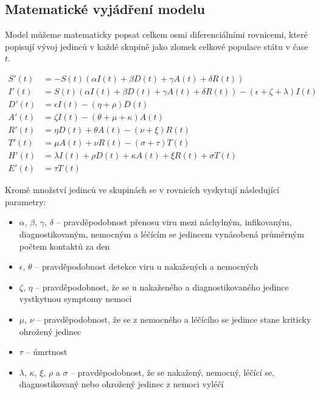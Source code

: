 \documentclass[a4paper,11pt]{article}
\begin{document}
		\subsection{Matematické vyjádření modelu}
		\label{mathmodel}
		Model můžeme matematicky popsat celkem osmi diferenciálními rovnicemi, které popisují vývoj jedinců v každé skupině jako zlomek celkové populace státu v čase $t$.
		
		\begin{align}
			S'(t) &= - S(t) (\alpha I(t) + \beta D(t) + \gamma A(t) + \delta R(t))\\
			I'(t) &= S(t) (\alpha I(t) + \beta D(t) + \gamma A(t) + \delta R(t)) - (\epsilon + \zeta + \lambda)I(t)\\
			D'(t) &= \epsilon I(t) - (\eta + \rho) D(t)\\
			A'(t) &= \zeta I(t) - (\theta + \mu + \kappa) A(t)\\
			R'(t) &= \eta D(t) + \theta A(t) - (\nu + \xi) R(t)\\
			T'(t) &= \mu A(t) + \nu R(t) - (\sigma + \tau) T(t)\\
			H'(t) &= \lambda I(t) + \rho D(t) + \kappa A(t) + \xi R(t) + \sigma T(t)\\
			E'(t) &= \tau T(t)
		\end{align}
	
	Kromě množství jedinců ve skupinách se v rovnicích vyskytují následující parametry:
	\begin{itemize}
		\item $\alpha$, $\beta$, $\gamma$, $\delta$ -- pravděpodobnost přenosu viru mezi náchylným, infikovaným, diagnostikovaným, nemocným a léčícím se jedincem vynásobená průměrným počtem kontaktů za den
		\item $\epsilon$, $\theta$ -- pravděpodobnost detekce viru u nakažených a nemocných
		\item $\zeta$, $\eta$ -- pravděpodobnost, že se u nakaženého a diagnostikovaného jedince vystkytnou symptomy nemoci
		\item $\mu$, $\nu$ -- pravděpodobnost, že se z nemocného a léčícího se jedince stane kriticky ohrožený jedinec
		\item $\tau$ -- úmrtnost
		\item $\lambda$, $\kappa$, $\xi$, $\rho$ a $\sigma$ -- pravděpodobnost, že se nakažený, nemocný, léčící se, diagnostikovaný nebo ohrožený jedinec z nemoci vyléčí
	\end{itemize}
		
\end{document}

